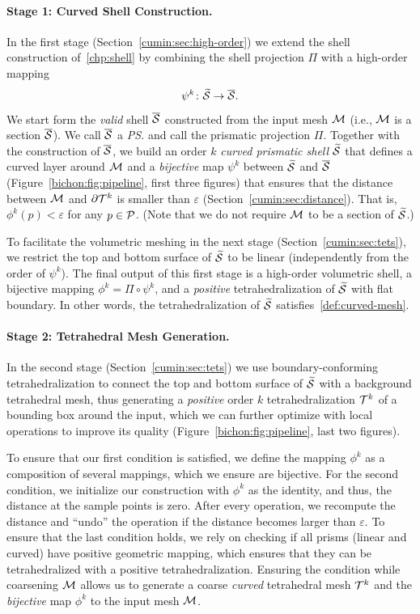 \paragraph{Stage 1: Curved Shell Construction.}
In the first stage (Section~\ref{cumin:sec:high-order}) we extend the shell construction of~\ref{chp:shell} by combining the shell projection $\Pi$ with {a} high-order mapping 
\[
\psi^k \colon \prS \to \PS.
\]
We start form the \emph{valid} shell $\PS$ constructed from the input mesh $\M$ (i.e., $\M$ is a section $\PS$). We call $\PS$ a \emph{\ps{}} and call the prismatic projection $\Pi$. Together with the construction of $\PS$, we build an order $k$ \emph{curved prismatic shell} $\prS$ that defines a curved layer around $\M$ and a \emph{bijective} map $\psi^k$ between $\prS$ and $\PS$ (Figure~\ref{bichon:fig:pipeline}, first three figures) that ensures that the distance between $\M$ and $\partial\T^k$ is smaller than $\varepsilon$ (Section~\ref{cumin:sec:distance}). That is, $\phi^k(p) < \varepsilon$ for any $p\in\P$. (Note that we do not require $\M$ to be a section of $\prS$.)

To facilitate the volumetric meshing in the next stage (Section~\ref{cumin:sec:tets}), we restrict the top and bottom surface of $\prS$ to be linear (independently from the order of $\psi^k$). The final output of this first stage is a high-order volumetric shell,
a bijective mapping $\phi^k = \Pi \circ \psi^k$,
and a \emph{positive} tetrahedralization of $\prS$ with flat boundary. In other words, the tetrahedralization of $\prS$ satisfies~\ref{def:curved-mesh}.

\paragraph{Stage 2: Tetrahedral Mesh Generation.}
In the second stage (Section~\ref{cumin:sec:tets}) we use boundary-conforming tetrahedralization to connect the top and bottom surface of $\prS$ with a background tetrahedral mesh, thus generating a \emph{positive} order $k$ tetrahedralization $\T^k$ of a bounding box around the input, which we can further optimize with local operations to improve its quality  (Figure~\ref{bichon:fig:pipeline}, last two figures). %


To ensure that our first condition is satisfied{,} we define the mapping $\phi^k$ as a composition of several mappings{,} which we ensure are bijective. 
For the second condition, we initialize our construction with $\phi^k$ {as} the identity, {and} thus, the distance at the sample points is zero. 
After every operation, we recompute the distance and ``undo'' the operation if the distance becomes larger than $\varepsilon$. To ensure that the last condition holds, we rely on checking if all prisms (linear and curved) have positive geometric mapping, which {ensures} that they can be tetrahedralized with a positive tetrahedralization. 
Ensuring the condition while coarsening $\M$ {allows} us to generate a coarse \emph{curved} tetrahedral mesh $\T^k$ and the \emph{bijective} map $\phi^k$ to the input mesh $\M$.


